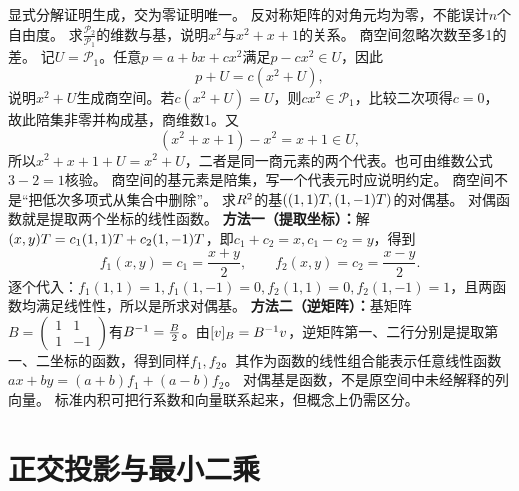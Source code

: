 {显式分解证明生成，交为零证明唯一。}
{反对称矩阵的对角元均为零，不能误计$n$个自由度。}
{求$\frac{\mathcal P_2}{\mathcal P_1}$的维数与基，说明$x^2$与$x^2+x+1$的关系。}
{商空间忽略次数至多1的差。}
{记$U=\mathcal P_1$。任意$p=a+bx+cx^2$满足$p-cx^2\in U$，因此
\[p+U=c(x^2+U),\]
说明$x^2+U$生成商空间。若$c(x^2+U)=U$，则$cx^2\in\mathcal P_1$，比较二次项得$c=0$，故此陪集非零并构成基，商维数1。又
\[(x^2+x+1)-x^2=x+1\in U,\]
所以$x^2+x+1+U=x^2+U$，二者是同一商元素的两个代表。也可由维数公式$3-2=1$核验。}
{商空间的基元素是陪集，写一个代表元时应说明约定。}
{商空间不是“把低次多项式从集合中删除”。}
{求$R^2$的基$((1,1)T,(1,-1)T)$的对偶基。}
{对偶函数就是提取两个坐标的线性函数。}
{\textbf{方法一（提取坐标）：}解$(x,y)T=c_1(1,1)T+c_2(1,-1)T$，即$c_1+c_2=x,c_1-c_2=y$，得到
\[f_1(x,y)=c_1=\dfrac{x+y}{2},\qquad f_2(x,y)=c_2=\dfrac{x-y}{2}.\]
逐个代入：$f_1(1,1)=1,f_1(1,-1)=0,f_2(1,1)=0,f_2(1,-1)=1$，且两函数均满足线性性，所以是所求对偶基。
\textbf{方法二（逆矩阵）：}基矩阵$B=\begin{pmatrix}1&1\\1&-1\end{pmatrix}$有$B^{-1}=\frac{B}{2}$。由$[v]_B=B^{-1} v$，逆矩阵第一、二行分别是提取第一、二坐标的函数，得到同样$f_1,f_2$。其作为函数的线性组合能表示任意线性函数$ax+by=(a+b)f_1+(a-b)f_2$。}
{对偶基是函数，不是原空间中未经解释的列向量。}
{标准内积可把行系数和向量联系起来，但概念上仍需区分。}


\section{正交投影与最小二乘}
